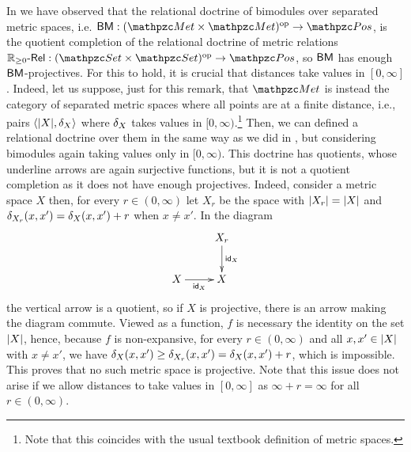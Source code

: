  
\begin{remark} 
In  we have observed that the relational doctrine of bimodules over separated metric spaces, i.e. $\fun{\BM}{\bop{\Met}}{\Pos}$, is the quotient completion of the relational doctrine of metric relations $\fun{\VRel\RPos}{\bop\Set}{\Pos}$, so $\mathsf{BM}$ has enough $\mathsf{BM}$-projectives. 
For this to hold, it is crucial that distances take values in $[0,\infty]$. 
Indeed, let us suppose, just for this remark, that $\Met$ is instead the category of  separated metric spaces where all points are at a finite distance, i.e., pairs ${\langle |X|,\delta_X \rangle }$ where $\delta_X$ takes values in $[0,\infty)$.\footnote{Note that this coincides with the usual textbook definition of metric spaces.} 
Then, we can defined a relational doctrine over them in the same way as we did in , but considering bimodules  again taking values only in $[0,\infty)$. 
This doctrine has quotients, whose underline arrows are again surjective functions, 
but it is not a quotient completion as it does not have enough projectives. 
Indeed, consider a metric space $X$ then, for every $r\in (0,\infty)$ let $X_r$ be the space with $|X_r|=|X|$ and $\delta_{X_r}(x,x') = \delta_X(x,x') + r$ when $x\ne x'$. 
In the diagram 
\[
\xymatrix{
& X_r
  \ar[d]^-{\id_X} 
\\
  X
  \ar[r]_-{\id_X}
& X
}
\] 
the vertical arrow is a quotient, so if $X$ is projective, there is an arrow 
making the diagram commute. 
Viewed as a function, $f$ is necessary the identity on  the set $|X|$, 
hence, because $f$ is non-expansive, for every $r\in(0,\infty)$ and all $x,x'\in|X|$ with $x\ne x'$, we have
$\delta_X(x,x') \geq \delta_{X_r}(x,x') = \delta_X(x,x') + r$, which is impossible. 
This proves that no such metric space is projective. 
% 
Note that this issue does not arise if we allow distances to take values in $[0,\infty]$ as $\infty + r = \infty$ for all $r \in (0,\infty)$.
\end{remark}


